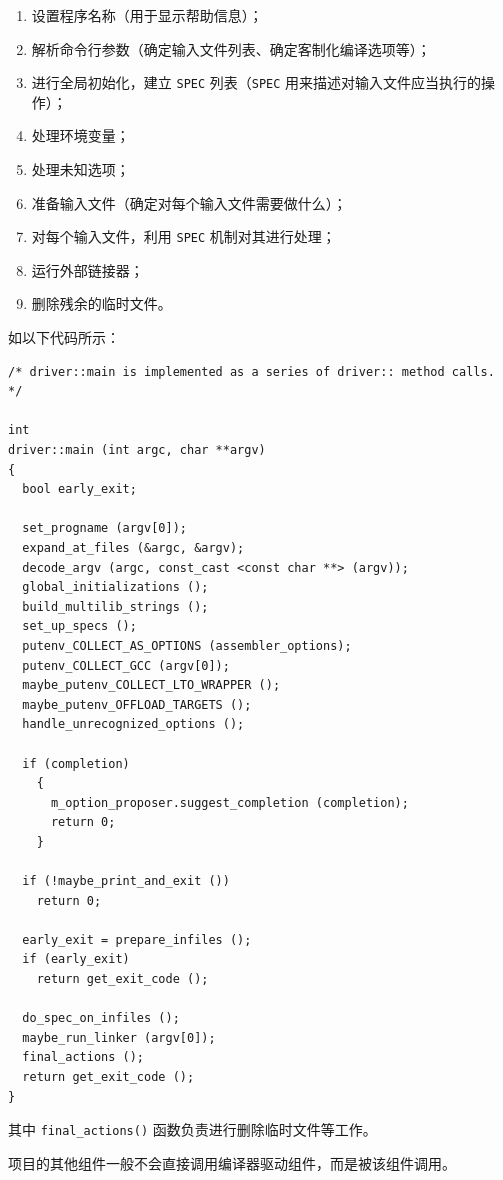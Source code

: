 \documentclass[12pt]{ctexrep}
\begin{document}
    \begin{enumerate}
        \item 设置程序名称（用于显示帮助信息）；
        \item 解析命令行参数（确定输入文件列表、确定客制化编译选项等）；
        \item 进行全局初始化，建立 \verb|SPEC| 列表（\verb|SPEC| 用来描述对输入文件应当执行的操作）；
        \item 处理环境变量；
        \item 处理未知选项；
        \item 准备输入文件（确定对每个输入文件需要做什么）；
        \item 对每个输入文件，利用 \verb|SPEC| 机制对其进行处理；
        \item 运行外部链接器；
        \item 删除残余的临时文件。
    \end{enumerate}

    如以下代码所示：

    \begin{verbatim}
/* driver::main is implemented as a series of driver:: method calls.  */
        
int
driver::main (int argc, char **argv)
{
  bool early_exit;

  set_progname (argv[0]);
  expand_at_files (&argc, &argv);
  decode_argv (argc, const_cast <const char **> (argv));
  global_initializations ();
  build_multilib_strings ();
  set_up_specs ();
  putenv_COLLECT_AS_OPTIONS (assembler_options);
  putenv_COLLECT_GCC (argv[0]);
  maybe_putenv_COLLECT_LTO_WRAPPER ();
  maybe_putenv_OFFLOAD_TARGETS ();
  handle_unrecognized_options ();

  if (completion)
    {
      m_option_proposer.suggest_completion (completion);
      return 0;
    }

  if (!maybe_print_and_exit ())
    return 0;

  early_exit = prepare_infiles ();
  if (early_exit)
    return get_exit_code ();

  do_spec_on_infiles ();
  maybe_run_linker (argv[0]);
  final_actions ();
  return get_exit_code ();
}
    \end{verbatim}

    其中 \texttt{final_actions()} 函数负责进行删除临时文件等工作。

    项目的其他组件一般不会直接调用编译器驱动组件，而是被该组件调用。
\end{document}

